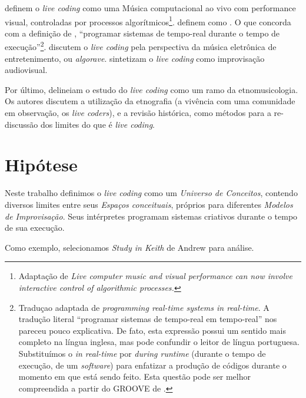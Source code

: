  definem o \emph{live coding} como uma Música computacional ao vivo com performance visual, controladas por processos algorítmicos\footnote{Adaptação de \emph{Live computer music and visual performance can now involve interactive control of algorithmic processes.}}.  definem como . O que concorda com a definição de , ``programar sistemas de tempo-real durante o tempo de execução''\footnote{Traduçao adaptada de \emph{programming real-time systems in real-time}. A tradução literal ``programar sistemas de tempo-real em tempo-real'' nos pareceu pouco explicativa. De fato, esta expressão possui um sentido mais completo na língua inglesa, mas pode confundir o leitor de língua portuguesa. Substituímos o \emph{in real-time} por \emph{during runtime} (durante o tempo de execução, de um \emph{software}) para enfatizar a produção de códigos durante o momento em que está sendo feito. Esta questão pode ser melhor compreendida a partir do GROOVE de .}.  discutem o \emph{live coding} pela perspectiva da música eletrônica de entretenimento, ou  \emph{algorave}.  sintetizam o \emph{live coding} como improvisação audiovisual.  

Por último,  delineiam o estudo do \emph{live coding} como um ramo da etnomusicologia. Os autores discutem a utilização da etnografia (a vivência com uma comunidade em observação, os \emph{live coders}), e a revisão histórica, como métodos para a re-discussão dos limites do que é \emph{live coding}.

\section*{Hipótese}

Neste trabalho definimos o \emph{live coding} como um \emph{Universo de Conceitos}, contendo diversos limites entre seus \emph{Espaços conceituais}, próprios para diferentes \emph{Modelos de Improvisação}. Seus intérpretes programam sistemas criativos durante o tempo de sua execução. 

Como exemplo, selecionamos \emph{Study in Keith} de Andrew  para análise.


